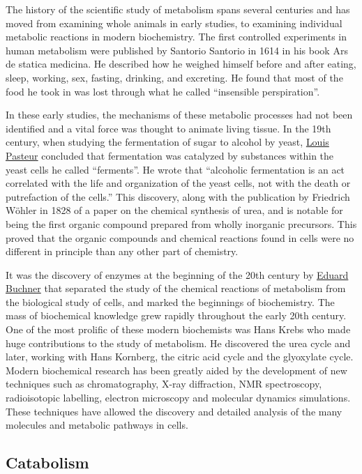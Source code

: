 The history of the scientific study of metabolism spans several centuries and has moved from examining whole animals in early studies, to examining individual metabolic reactions in modern biochemistry. The first controlled experiments in human metabolism were published by Santorio Santorio in 1614 in his book Ars de statica medicina. He described how he weighed himself before and after eating, sleep, working, sex, fasting, drinking, and excreting. He found that most of the food he took in was lost through what he called ``insensible perspiration''.

In these early studies, the mechanisms of these metabolic processes had not been identified and a vital force was thought to animate living tissue. In the 19th century, when studying the fermentation of sugar to alcohol by yeast, \href{https://en.wikipedia.org/wiki/Louis_Pasteur}{Louis Pasteur} concluded that fermentation was catalyzed by substances within the yeast cells he called ``ferments''. He wrote that ``alcoholic fermentation is an act correlated with the life and organization of the yeast cells, not with the death or putrefaction of the cells.'' This discovery, along with the publication by Friedrich Wöhler in 1828 of a paper on the chemical synthesis of urea, and is notable for being the first organic compound prepared from wholly inorganic precursors. This proved that the organic compounds and chemical reactions found in cells were no different in principle than any other part of chemistry.

It was the discovery of enzymes at the beginning of the 20th century by \href{https://en.wikipedia.org/wiki/Eduard_Buchner}{Eduard Buchner} that separated the study of the chemical reactions of metabolism from the biological study of cells, and marked the beginnings of biochemistry. The mass of biochemical knowledge grew rapidly throughout the early 20th century. One of the most prolific of these modern biochemists was Hans Krebs who made huge contributions to the study of metabolism. He discovered the urea cycle and later, working with Hans Kornberg, the citric acid cycle and the glyoxylate cycle. Modern biochemical research has been greatly aided by the development of new techniques such as chromatography, X-ray diffraction, NMR spectroscopy, radioisotopic labelling, electron microscopy and molecular dynamics simulations. These techniques have allowed the discovery and detailed analysis of the many molecules and metabolic pathways in cells.

\hypertarget{catabolism}{%
\subsection{Catabolism}\label{catabolism}}


